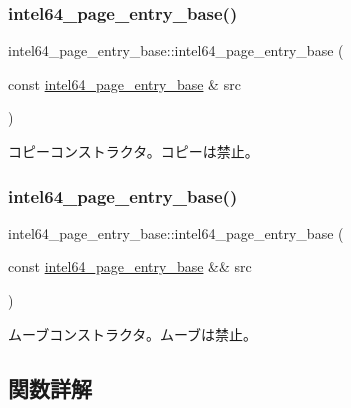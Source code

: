\subsubsection{\texorpdfstring{intel64\+\_\+page\+\_\+entry\+\_\+base()}{intel64\_page\_entry\_base()}\hspace{0.1cm}{\footnotesize\ttfamily [2/3]}}
{\footnotesize\ttfamily intel64\+\_\+page\+\_\+entry\+\_\+base\+::intel64\+\_\+page\+\_\+entry\+\_\+base (\begin{DoxyParamCaption}\item[{const \hyperlink{classintel64__page__entry__base}{intel64\+\_\+page\+\_\+entry\+\_\+base} \&}]{src }\end{DoxyParamCaption})\hspace{0.3cm}{\ttfamily [delete]}}

コピーコンストラクタ。コピーは禁止。 \hypertarget{classintel64__page__entry__base_a6590bbc362f52b6e0a2480e02f3e3eb6}{}\label{classintel64__page__entry__base_a6590bbc362f52b6e0a2480e02f3e3eb6} 
\subsubsection{\texorpdfstring{intel64\+\_\+page\+\_\+entry\+\_\+base()}{intel64\_page\_entry\_base()}\hspace{0.1cm}{\footnotesize\ttfamily [3/3]}}
{\footnotesize\ttfamily intel64\+\_\+page\+\_\+entry\+\_\+base\+::intel64\+\_\+page\+\_\+entry\+\_\+base (\begin{DoxyParamCaption}\item[{const \hyperlink{classintel64__page__entry__base}{intel64\+\_\+page\+\_\+entry\+\_\+base} \&\&}]{src }\end{DoxyParamCaption})\hspace{0.3cm}{\ttfamily [delete]}}

ムーブコンストラクタ。ムーブは禁止。 

\subsection{関数詳解}
\hypertarget{classintel64__page__entry__base_a3d3172d56b2753c79b5d8f92aa186f6d}{}\label{classintel64__page__entry__base_a3d3172d56b2753c79b5d8f92aa186f6d} 
